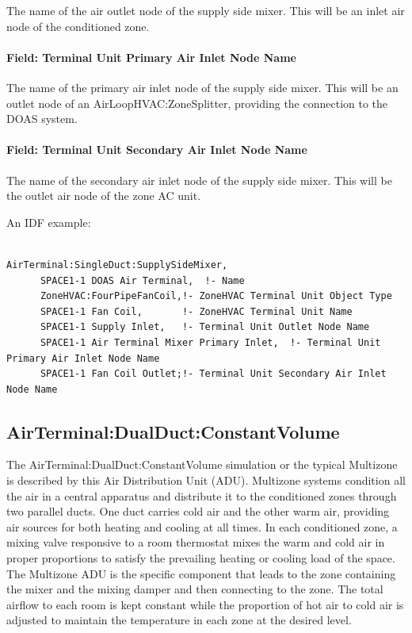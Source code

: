 The name of the air outlet node of the supply side mixer. This will be an inlet air node of the conditioned zone.

\paragraph{Field: Terminal Unit Primary Air Inlet Node Name}\label{field-terminal-unit-primary-air-inlet-node-name-1}

The name of the primary air inlet node of the supply side mixer. This will be an outlet node of an AirLoopHVAC:ZoneSplitter, providing the connection to the DOAS system.

\paragraph{Field: Terminal Unit Secondary Air Inlet Node Name}\label{field-terminal-unit-secondary-air-inlet-node-name-1}

The name of the secondary air inlet node of the supply side mixer. This will be the outlet air node of the zone AC unit.

An IDF example:

\begin{lstlisting}

AirTerminal:SingleDuct:SupplySideMixer,
      SPACE1-1 DOAS Air Terminal,  !- Name
      ZoneHVAC:FourPipeFanCoil,!- ZoneHVAC Terminal Unit Object Type
      SPACE1-1 Fan Coil,       !- ZoneHVAC Terminal Unit Name
      SPACE1-1 Supply Inlet,   !- Terminal Unit Outlet Node Name
      SPACE1-1 Air Terminal Mixer Primary Inlet,  !- Terminal Unit Primary Air Inlet Node Name
      SPACE1-1 Fan Coil Outlet;!- Terminal Unit Secondary Air Inlet Node Name
\end{lstlisting}

\subsection{AirTerminal:DualDuct:ConstantVolume}\label{airterminaldualductconstantvolume}

The AirTerminal:DualDuct:ConstantVolume simulation or the typical Multizone is described by this Air Distribution Unit (ADU). Multizone systems condition all the air in a central apparatus and distribute it to the conditioned zones through two parallel ducts. One duct carries cold air and the other warm air, providing air sources for both heating and cooling at all times. In each conditioned zone, a mixing valve responsive to a room thermostat mixes the warm and cold air in proper proportions to satisfy the prevailing heating or cooling load of the space. The Multizone ADU is the specific component that leads to the zone containing the mixer and the mixing damper and then connecting to the zone. The total airflow to each room is kept constant while the proportion of hot air to cold air is adjusted to maintain the temperature in each zone at the desired level.

